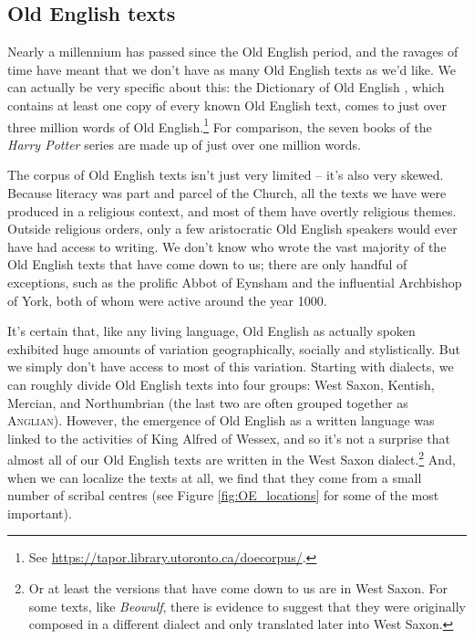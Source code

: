 \subsection{Old English texts}\label{OE-texts}

Nearly a millennium has passed since the Old English period, and the ravages of time have meant that we don't have as many Old English texts as we'd like. We can actually be very specific about this: the Dictionary of Old English , which contains at least one copy of every known Old English text, comes to just over three million words of Old English.\footnote{See \url{https://tapor.library.utoronto.ca/doecorpus/}.} For comparison, the seven books of the \emph{Harry Potter} series are made up of just over one million words.

The corpus of Old English texts isn't just very limited -- it's also very skewed. Because literacy was part and parcel of the Church, all the texts we have were produced in a religious context, and most of them have overtly religious themes. Outside religious orders, only a few aristocratic Old English speakers would ever have had access to writing. We don't know who wrote the vast majority of the Old English texts that have come down to us; there are only  handful of exceptions, such as the prolific Abbot  of Eynsham and the influential Archbishop  of York, both of whom were active around the year 1000.

It's certain that, like any living language, Old English as actually spoken exhibited huge amounts of variation geographically, socially and stylistically. But we simply don't have access to most of this variation. Starting with dialects, we can roughly divide Old English texts into four groups: West Saxon, Kentish, Mercian, and Northumbrian (the last two are often grouped together as \textsc{Anglian}). However, the emergence of Old English as a written language was linked to the activities of King Alfred of Wessex, and so it's not a surprise that almost all of our Old English texts are written in the West Saxon dialect.\footnote{Or at least the versions that have come down to us are in West Saxon. For some texts, like \textit{Beowulf}, there is evidence to suggest that they were originally composed in a different dialect and only translated later into West Saxon.} And, when we can localize the texts at all, we find that they come from a small number of scribal centres (see Figure \ref{fig:OE_locations} for some of the most important).

